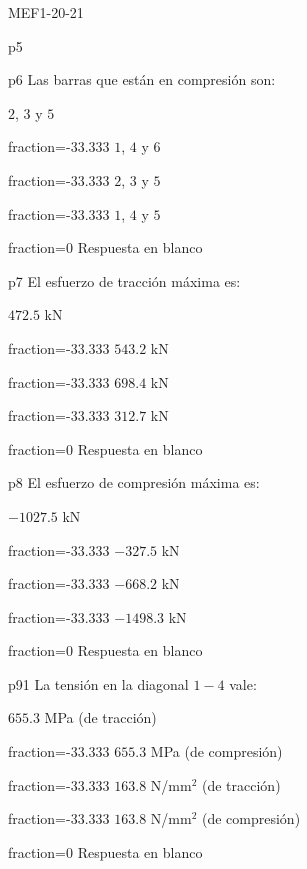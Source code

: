 \documentclass[a4paper]{article}
\begin{document}
\begin{quiz}{MEF1-20-21}
\begin{multi}{p5}
\end{multi}
\begin{multi}{p6}
Las barras que est\'an en compresi\'on son:
	\item* $2$, $3$ y $5$
	\item[fraction=-33.333]  $1$, $4$ y $6$
	\item[fraction=-33.333]  $2$, $3$ y $5$
	\item[fraction=-33.333]  $1$, $4$ y $5$
	\item[fraction=0] Respuesta en blanco
\end{multi}
\begin{multi}{p7}
El esfuerzo de tracci\'on m\'axima es:
	\item* $472.5$ kN
	\item[fraction=-33.333]  $543.2$ kN
	\item[fraction=-33.333]  $698.4$ kN
	\item[fraction=-33.333]  $312.7$ kN
	\item[fraction=0] Respuesta en blanco
\end{multi}
\begin{multi}{p8}
El esfuerzo de compresi\'on m\'axima es:
	\item* $-1027.5$ kN
	\item[fraction=-33.333]  $-327.5$ kN
	\item[fraction=-33.333]  $-668.2$ kN
	\item[fraction=-33.333]  $-1498.3$ kN
	\item[fraction=0] Respuesta en blanco
\end{multi}
\begin{multi}{p91}
La tensi\'on en la diagonal $1-4$ vale:
	\item* $655.3$ MPa (de tracci\'on)
	\item[fraction=-33.333]  $655.3$ MPa (de compresi\'on)
	\item[fraction=-33.333]  $163.8$ N/mm$^2$ (de tracci\'on)
	\item[fraction=-33.333]  $163.8$ N/mm$^2$ (de compresi\'on)
	\item[fraction=0] Respuesta en blanco
\end{multi}

\end{quiz}
\end{document}

